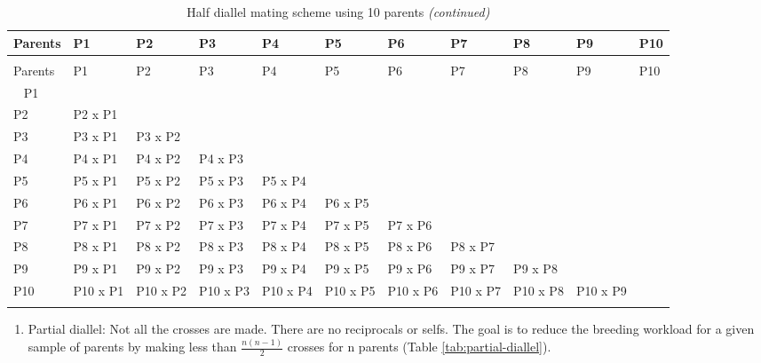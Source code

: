 \documentclass[nofonts,]{tufte-handout}
\providecommand{\tightlist}{%
  \setlength{\itemsep}{0pt}\setlength{\parskip}{0pt}}
\begin{document}
\begingroup\fontsize{8}{10}\selectfont

\begin{longtable}{>{\raggedright\arraybackslash}p{3.5em}>{\raggedright\arraybackslash}p{3.5em}>{\raggedright\arraybackslash}p{3.5em}>{\raggedright\arraybackslash}p{3.5em}>{\raggedright\arraybackslash}p{3.5em}>{\raggedright\arraybackslash}p{3.5em}>{\raggedright\arraybackslash}p{3.5em}>{\raggedright\arraybackslash}p{3.5em}>{\raggedright\arraybackslash}p{3.5em}>{\raggedright\arraybackslash}p{3.5em}>{\raggedright\arraybackslash}p{3.5em}}
\caption{\label{tab:half-diallel}Half diallel mating scheme using 10 parents}\\
\toprule
Parents & P1 & P2 & P3 & P4 & P5 & P6 & P7 & P8 & P9 & P10\\
\midrule
\endfirsthead
\caption[]{Half diallel mating scheme using 10 parents \textit{(continued)}}\\
\toprule
Parents & P1 & P2 & P3 & P4 & P5 & P6 & P7 & P8 & P9 & P10\\
\midrule
\endhead
\
\endfoot
\bottomrule
\endlastfoot
\rowcolor{gray!6}  P1 &  &  &  &  &  &  &  &  &  & \\
P2 & P2 x P1 &  &  &  &  &  &  &  &  & \\
\rowcolor{gray!6}  P3 & P3 x P1 & P3 x P2 &  &  &  &  &  &  &  & \\
P4 & P4 x P1 & P4 x P2 & P4 x P3 &  &  &  &  &  &  & \\
\rowcolor{gray!6}  P5 & P5 x P1 & P5 x P2 & P5 x P3 & P5 x P4 &  &  &  &  &  & \\
\addlinespace
P6 & P6 x P1 & P6 x P2 & P6 x P3 & P6 x P4 & P6 x P5 &  &  &  &  & \\
\rowcolor{gray!6}  P7 & P7 x P1 & P7 x P2 & P7 x P3 & P7 x P4 & P7 x P5 & P7 x P6 &  &  &  & \\
P8 & P8 x P1 & P8 x P2 & P8 x P3 & P8 x P4 & P8 x P5 & P8 x P6 & P8 x P7 &  &  & \\
\rowcolor{gray!6}  P9 & P9 x P1 & P9 x P2 & P9 x P3 & P9 x P4 & P9 x P5 & P9 x P6 & P9 x P7 & P9 x P8 &  & \\
P10 & P10 x P1 & P10 x P2 & P10 x P3 & P10 x P4 & P10 x P5 & P10 x P6 & P10 x P7 & P10 x P8 & P10 x P9 & \\*
\end{longtable}
\endgroup{}

\clearpage

\begin{enumerate}
\def\labelenumi{\arabic{enumi}.}
\setcounter{enumi}{2}
\tightlist
\item
  Partial diallel: Not all the crosses are made. There are no
  reciprocals or selfs. The goal is to reduce the breeding workload for
  a given sample of parents by making less than \(\frac{n(n-1)}{2}\)
  crosses for n parents (Table \ref{tab:partial-diallel}).
\end{enumerate}
\end{document}
